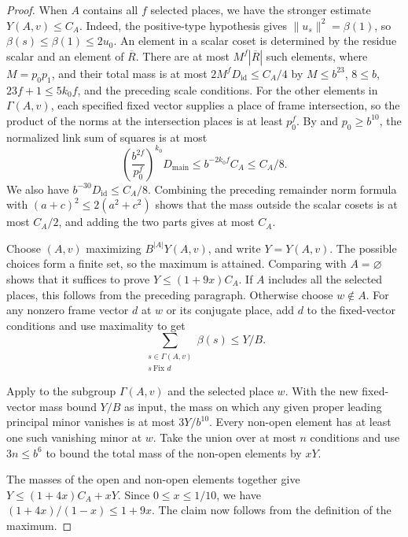 \begin{proof}
When $A$ contains all $f$ selected places, we have the stronger estimate $Y(A,v)\le C_A$.
Indeed, the positive-type hypothesis gives $\|u_s\|^2=\beta(1)$, so $\beta(s)\le\beta(1)\le2u_0$.
An element in a scalar coset is determined by the residue scalar and an element of $\overline R$.
There are at most $M^f|\overline R|$ such elements, where $M=p_0p_1$,
and their total mass is at most $2M^f D_{\mathrm{id}}\le C_A/4$
by $M\le b^{23}$, $8\le b$, $23f+1\le5k_0f$, and the preceding scale conditions.
For the other elements in $\Gamma(A,v)$, each specified fixed vector supplies a place of frame intersection,
so the product of the norms at the intersection places is at least $p_0^f$.
By  and $p_0\ge b^{10}$, the normalized link sum of squares is at most
\[
 \left(\frac{b^{2f}}{p_0^f}\right)^{k_0}D_{\mathrm{main}}
 \le b^{-2k_0f}C_A\le C_A/8.
\]
We also have $b^{-30}D_{\mathrm{id}}\le C_A/8$.
Combining the preceding remainder norm formula with $(a+c)^2\le2(a^2+c^2)$
shows that the mass outside the scalar cosets is at most $C_A/2$,
and adding the two parts gives at most $C_A$.

Choose $(A,v)$ maximizing $B^{|A|}Y(A,v)$, and write $Y=Y(A,v)$.
The possible choices form a finite set, so the maximum is attained. Comparing with $A=\varnothing$ shows that
it suffices to prove $Y\le(1+9x)C_A$. If $A$ includes all the selected places, this follows from the preceding paragraph.
Otherwise choose $w\notin A$. For any nonzero frame vector $d$ at $w$ or its conjugate place,
add $d$ to the fixed-vector conditions and use maximality to get
\[
 \sum_{\substack{s\in\Gamma(A,v)\\s\ \text{Fix }d}}\beta(s)\le Y/B.
\]

Apply  to the subgroup $\Gamma(A,v)$ and the selected place $w$.
With the new fixed-vector mass bound $Y/B$ as input, the mass on which any given proper leading principal minor vanishes is at most $3Y/b^{10}$.
Every non-open element has at least one such vanishing minor at $w$. Take the union over at most $n$ conditions
and use $3n\le b^6$ to bound the total mass of the non-open elements by $xY$.

The masses of the open and non-open elements together give $Y\le(1+4x)C_A+xY$.
Since $0\le x\le1/10$, we have
$(1+4x)/(1-x)\le1+9x$. The claim now follows from the definition of the maximum.
\end{proof}

